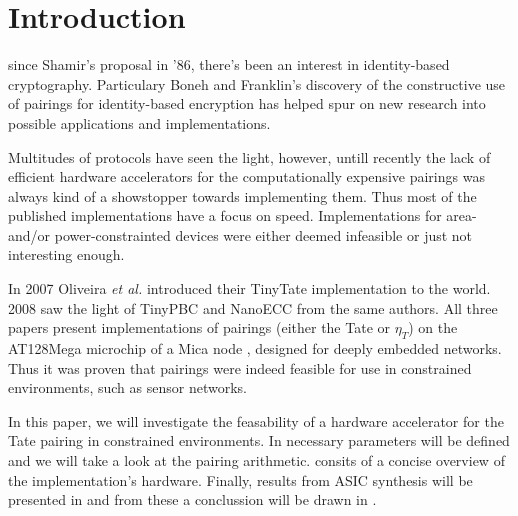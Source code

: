 \section{Introduction\label{section-introduction}}

 since Shamir's proposal \cite{shamir} in '86, there's been an interest in identity-based cryptography. Particulary Boneh and Franklin's \cite{boneh} discovery of the constructive use of pairings for identity-based encryption has helped spur on new research into possible applications and implementations.

Multitudes of protocols have seen the light, however, untill recently the lack of efficient hardware accelerators for the computationally expensive pairings was always kind of a showstopper towards implementing them. Thus most of the published implementations have a focus on speed. Implementations for area- and/or power-constrainted devices were either deemed infeasible or just not interesting enough. 

In 2007 Oliveira \emph{et al.} introduced their TinyTate \cite{tinytate} implementation to the world. 2008 saw the light of TinyPBC \cite{tinypbc} and NanoECC \cite{nanoecc} from the same authors. All three papers present implementations of pairings (either the Tate or $\eta_T$) on the AT128Mega microchip of a Mica node \cite{mica}, designed for deeply embedded networks. Thus it was proven that pairings were indeed feasible for use in constrained environments, such as sensor networks.


In this paper, we will investigate the feasability of a hardware accelerator for the Tate pairing in constrained environments. In  necessary parameters will be defined and we will take a look at the pairing arithmetic.  consits of a concise overview of the implementation's hardware. Finally, results from ASIC synthesis will be presented in  and from these a conclussion will be drawn in .
